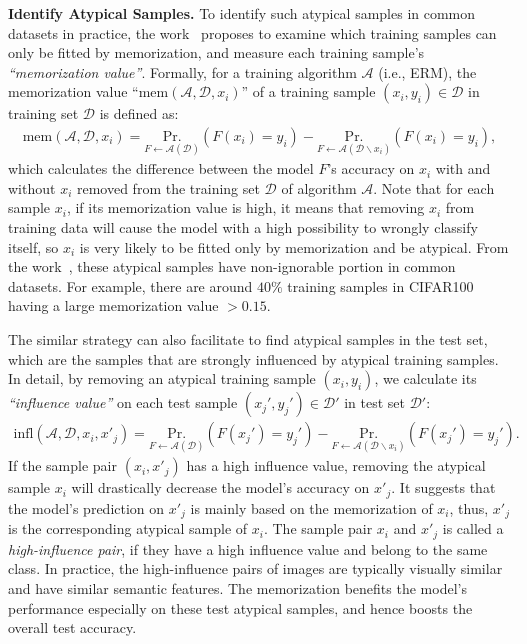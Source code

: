 \noindent\textbf{Identify Atypical Samples.} To identify such atypical samples in common datasets in practice, the work~\cite{feldman2020neural} proposes to examine which training samples can only be fitted by memorization, and measure each training sample's \textit{``memorization value''}. Formally, for a training algorithm $\mathcal{A}$ (i.e., ERM), the memorization value ``$\text{mem}(\mathcal{A}, \mathcal{D}, x_i)$'' of a training sample $(x_i,y_i)\in \mathcal{D}$ in training set $\mathcal{D}$ is defined as:
\begin{align}\label{eq:mem}
    \text{mem}(\mathcal{A}, \mathcal{D}, x_i) = \underset{F\leftarrow \mathcal{A}(\mathcal{D})}{\text{Pr.}} (F(x_i) = y_i) - \underset{F\leftarrow \mathcal{A}(\mathcal{D}\backslash x_i)}{\text{Pr.}} (F(x_i) = y_i),
\end{align}
which calculates the difference between the model $F$'s accuracy on $x_i$ with and without $x_i$ removed from the training set $\mathcal{D}$ of algorithm $\mathcal{A}$. 
Note that for each sample $x_i$, if its memorization value is high, it means that removing $x_i$ from training data will cause the model with a high possibility to wrongly classify itself, so $x_i$ is very likely to be fitted only by memorization and be atypical. From the work~\cite{feldman2020neural}, these atypical samples have non-ignorable portion in common datasets. For example, there are around $40\%$ training samples in CIFAR100 having a large memorization value $>0.15$. 

The similar strategy can also facilitate to find atypical samples in the test set, which are the samples that are strongly influenced by atypical training samples.
In detail, by removing an atypical training sample $(x_i, y_i)$, we calculate its \textit{``influence value''} on each test sample $(x_j', y_j')\in\mathcal{D}'$ in test set $\mathcal{D}'$:
\begin{align}\label{eq:infl}
    \text{infl}(\mathcal{A}, \mathcal{D}, x_i, x'_j) = \underset{F\leftarrow \mathcal{A}(\mathcal{D})}{\text{Pr.}} (F(x_j') = y_j') - \underset{F\leftarrow \mathcal{A}(\mathcal{D}\backslash x_i)}{\text{Pr.}} (F(x_j') = y_j').
\end{align} 
If the sample pair $(x_i,x'_j)$ has a high influence value, removing the atypical sample $x_i$ will drastically decrease the model's accuracy on $x'_j$. It suggests that the model's prediction on $x'_j$ is mainly based on the memorization of $x_i$, thus, $x'_j$ is the corresponding atypical sample of $x_i$. The sample pair $x_i$ and $x'_j$ is called a \textit{high-influence pair}, if they have a high influence value and belong to the same class. In practice, the high-influence pairs of images are typically visually similar and have similar semantic features. The memorization benefits the model's performance especially on these test atypical samples, and hence boosts the overall test accuracy. 

